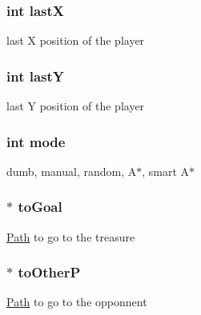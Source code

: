 \subsubsection[{\texorpdfstring{lastX}{lastX}}]{\setlength{\rightskip}{0pt plus 5cm}int lastX}\hypertarget{struct___player_a7bb8b2cfc1aec0db2429c600cddccf17}{}\label{struct___player_a7bb8b2cfc1aec0db2429c600cddccf17}
last X position of the player 
\subsubsection[{\texorpdfstring{lastY}{lastY}}]{\setlength{\rightskip}{0pt plus 5cm}int lastY}\hypertarget{struct___player_ae135df8cfc9b15d97e97b400a5cbc768}{}\label{struct___player_ae135df8cfc9b15d97e97b400a5cbc768}
last Y position of the player 
\subsubsection[{\texorpdfstring{mode}{mode}}]{\setlength{\rightskip}{0pt plus 5cm}int mode}\hypertarget{struct___player_a1ea5d0cb93f22f7d0fdf804bd68c3326}{}\label{struct___player_a1ea5d0cb93f22f7d0fdf804bd68c3326}
dumb, manual, random, A$\ast$, smart A$\ast$ 
\subsubsection[{\texorpdfstring{to\+Goal}{toGoal}}]{$\ast$ to\+Goal}\hypertarget{struct___player_ac7fee391a1ea765fcd9a813684459133}{}\label{struct___player_ac7fee391a1ea765fcd9a813684459133}
\hyperlink{struct_path}{Path} to go to the treasure 
\subsubsection[{\texorpdfstring{to\+OtherP}{toOtherP}}]{$\ast$ to\+OtherP}\hypertarget{struct___player_acb6bf1fa3b8884d0c9ce0b566a534bcc}{}\label{struct___player_acb6bf1fa3b8884d0c9ce0b566a534bcc}
\hyperlink{struct_path}{Path} to go to the opponnent 
